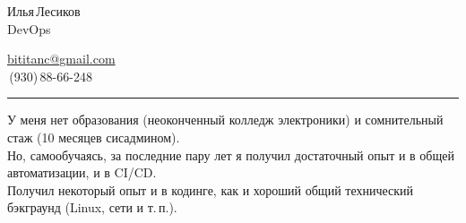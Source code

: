 \documentclass[11pt, a4paper]{article}
\begin{document}


{\setlength\multicolsep{0pt}%
\begin{multicols}{2}





\begin{spacing}{1.5}
  {\LARGE Илья\,Лесиков}\\
  {\large DevOps}\hspace{1.3cm}{\large 25\,лет}
\end{spacing}

\columnbreak

\begin{flushright}
  \begin{spacing}{1.3}
    {\large \href{mailto:bititanc@gmail.com}{bititanc@gmail.com}}\\
    \fontsize{1.4em}{0}\,(930)\,88-66-248 \normalsize\\
  \end{spacing}
\end{flushright}

\end{multicols}
}

\vspace{-10pt}
\textcolor[RGB]{220,220,220}{\rule{\linewidth}{0.2pt}}
\vspace{5pt}

У меня нет образования (неоконченный колледж электроники) и сомнительный стаж (10 месяцев сисадмином).\\
Но, самообучаясь, за последние пару лет я получил достаточный опыт и в общей автоматизации, и в CI/CD.\\
Получил некоторый опыт и в кодинге, как и хороший общий технический бэкграунд (Linux, сети и т.\,п.).
\end{document}
